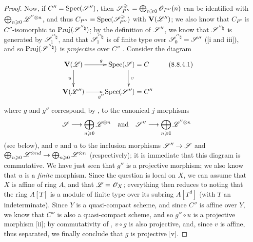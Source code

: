 \begin{proof}
Now, if $C''=\operatorname{Spec}(\mathscr{S}'')$, then $\mathscr{S}_{P''}^\geqslant=\bigoplus_{n\geqslant0}\mathscr{O}_{P''}(n)$ can be identified with $\bigoplus_{n\geqslant0}\mathscr{L}^{''\otimes n}$, and thus $C_{P''}=\operatorname{Spec}(\mathscr{S}_{P''}^\geqslant)$ with $\mathbf{V}(\mathscr{L}'')$;
we also know  that $C_{P''}$ is $C''$-isomorphic to $\operatorname{Proj}(\mathscr{S}^{''\natural})$;
by the definition of $\mathscr{S}''$, we know that $\mathscr{S}^{''\natural}$ is generated by $\mathscr{S}_1^{''\natural}$, and that $\mathscr{S}_1^{''\natural}$ is of finite type over $\mathscr{S}_0^{''\natural}=\mathscr{S}''$ ([i and iii]), and so $\operatorname{Proj}(\mathscr{S}^{''\natural})$ is \emph{projective} over $C''$ .
Consider the diagram
\[
\label{II.8.8.4.1}
  \xymatrix{
    \bb{V}(\sh{L})
      \ar[r]^{g}
      \ar[d]_{u}
  & \Spec(\sh{S}) = C
      \ar[d]^{v}
  \\\bb{V}(\sh{L}'')
      \ar[r]_{g''}
  & \Spec(\sh{S}'') = C''
  }
\tag{8.8.4.1}
\]
where $g$ and $g''$ correspond, by , to the canonical $j$-morphisms
\[
  \sh{S} \to \bigoplus_{n\geq0}\sh{L}^{\otimes n}
  \quad\mbox{and}\quad
  \sh{S}'' \to \bigoplus_{n\geq0}\sh{L}^{''\otimes n}
\]
 (see  below), and $v$ and $u$ to the inclusion morphisms $\sh{S}''\to\sh{S}$ and $\bigoplus_{n\geq0}\sh{L}^{\otimes nd}\to\bigoplus_{n\geq0}\sh{L}^{\otimes n}$ (respectively);
it is immediate  that this diagram is commutative.
We have just seen that $g''$ is a projective morphism;
we also know that $u$ is a \emph{finite} morphism.
Since the question is local on $X$, we can assume that $X$ is affine of ring $A$, and that $\mathscr{L}=\mathscr{O}_X$;
everything then reduces to noting that the ring $A[T]$ is a module of finite type over its subring $A[T^d]$ (with $T$ an indeterminate).
Since $Y$ is a quasi-compact scheme, and since $C''$ is affine over $Y$, we know that $C''$ is also a quasi-compact scheme,
and so $g''\circ u$ is a projective morphism [ii];
by commutativity of , $v\circ g$ is also projective, and, since $v$ is affine, thus separated, we finally conclude that $g$ is projective [v].
\end{proof}

